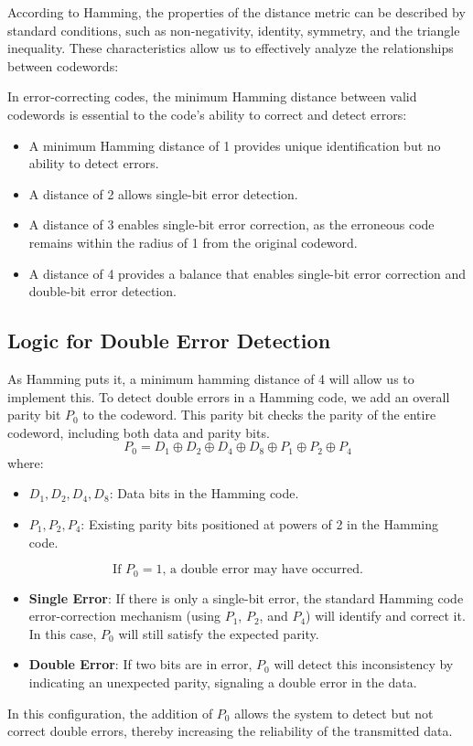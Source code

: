 \documentclass[12pt]{article}
\begin{document}
According to Hamming, the properties of the distance metric can be described by standard conditions, such as non-negativity, identity, symmetry, and the triangle inequality. These characteristics allow us to effectively analyze the relationships between codewords:

In error-correcting codes, the minimum Hamming distance between valid codewords is essential to the code’s ability to correct and detect errors:

\begin{itemize}
	\item A minimum Hamming distance of 1 provides unique identification but no ability to detect errors.
	\item A distance of 2 allows single-bit error detection.
	\item A distance of 3 enables single-bit error correction, as the erroneous code remains within the radius of 1 from the original codeword.
	\item A distance of 4 provides a balance that enables single-bit error correction and double-bit error detection.
\end{itemize}
\subsection*{Logic for Double Error Detection}
As Hamming puts it, a minimum hamming  distance of 4 will allow us to implement this. To detect double errors in a Hamming code, we add an overall parity bit \( P_0 \) to the codeword. This parity bit checks the parity of the entire codeword, including both data and parity bits.
\[
	P_0 = D_1 \oplus D_2 \oplus D_4 \oplus D_8 \oplus P_1 \oplus P_2 \oplus P_4
\]
where:
\begin{itemize}
	\item \( D_1, D_2, D_4, D_8 \): Data bits in the Hamming code.
	\item \( P_1, P_2, P_4 \): Existing parity bits positioned at powers of 2 in the Hamming code.
\end{itemize}
\[
	\text{If } P_0 = 1 \text{, a double error may have occurred.}
\]
\begin{itemize}
	\item \textbf{Single Error}: If there is only a single-bit error, the standard Hamming code error-correction mechanism (using \( P_1 \), \( P_2 \), and \( P_4 \)) will identify and correct it. In this case, \( P_0 \) will still satisfy the expected parity.
	\item \textbf{Double Error}: If two bits are in error, \( P_0 \) will detect this inconsistency by indicating an unexpected parity, signaling a double error in the data.
\end{itemize}
In this configuration, the addition of \( P_0 \) allows the system to detect but not correct double errors, thereby increasing the reliability of the transmitted data.
\end{document}
